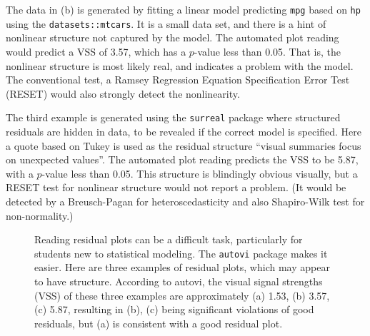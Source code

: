 \documentclass[
doublespace,
  times]{anzsauth}
\begin{document}
The data in (b) is generated by fitting a linear model predicting
\texttt{mpg} based on \texttt{hp} using the \texttt{datasets::mtcars}.
It is a small data set, and there is a hint of nonlinear structure not
captured by the model. The automated plot reading would predict a VSS of
3.57, which has a \(p\)-value less than 0.05. That is, the nonlinear
structure is most likely real, and indicates a problem with the model.
The conventional test, a Ramsey Regression Equation Specification Error
Test (RESET) \citep{ramsey1969tests} would also strongly detect the
nonlinearity.

The third example is generated using the \texttt{surreal} package
\citep{surreal} where structured residuals are hidden in data, to be
revealed if the correct model is specified. Here a quote based on Tukey
is used as the residual structure ``visual summaries focus on unexpected
values''. The automated plot reading predicts the VSS to be 5.87, with a
\(p\)-value less than 0.05. This structure is blindingly obvious
visually, but a RESET test for nonlinear structure would not report a
problem. (It would be detected by a Breusch-Pagan for heteroscedasticity
and also Shapiro-Wilk test \citep{shapiro1965analysis} for
non-normality.)

\begin{figure}


\caption{\label{fig-three-examples}Reading residual plots can be a
difficult task, particularly for students new to statistical modeling.
The \texttt{autovi} package makes it easier. Here are three examples of
residual plots, which may appear to have structure. According to autovi,
the visual signal strengths (VSS) of these three examples are
approximately (a) 1.53, (b) 3.57, (c) 5.87, resulting in (b), (c) being
significant violations of good residuals, but (a) is consistent with a
good residual plot.}

\end{figure}%
\end{document}
